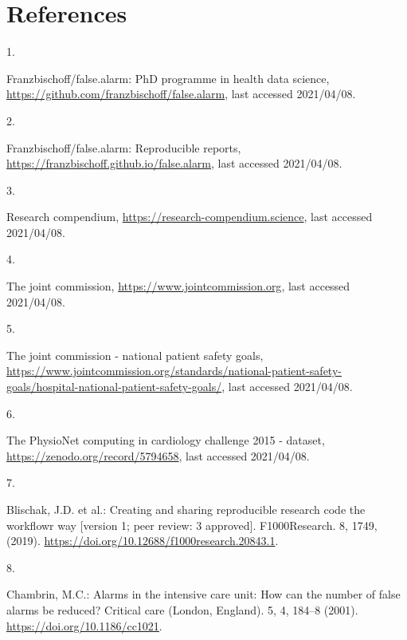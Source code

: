 \documentclass[runningheads]{llncs}
\newlength{\cslhangindent}
\newlength{\csllabelwidth}
\newenvironment{CSLReferences}[2] %
 {%
  \setlength{\parindent}{0pt}
  \ifodd #1 \everypar{\setlength{\hangindent}{\cslhangindent}}\ignorespaces\fi
  \ifnum #2 > 0
  \setlength{\parskip}{#2\baselineskip}
  \fi
 }%
 {}
\newcommand{\CSLLeftMargin}[1]{\parbox[t]{\csllabelwidth}{#1}}
\newcommand{\CSLRightInline}[1]{\parbox[t]{\linewidth - \csllabelwidth}{#1}\break}
\begin{document}
\hypertarget{references}{%
\section*{References}\label{references}}

\hypertarget{refs}{}
\begin{CSLReferences}{0}{0}
\leavevmode{}%
\CSLLeftMargin{1. }
\CSLRightInline{Franzbischoff/false.alarm: PhD programme in health data
science, \url{https://github.com/franzbischoff/false.alarm}, last
accessed 2021/04/08.}

\leavevmode{}%
\CSLLeftMargin{2. }
\CSLRightInline{Franzbischoff/false.alarm: Reproducible reports,
\url{https://franzbischoff.github.io/false.alarm}, last accessed
2021/04/08.}

\leavevmode{}%
\CSLLeftMargin{3. }
\CSLRightInline{Research compendium,
\url{https://research-compendium.science}, last accessed 2021/04/08.}

\leavevmode{}%
\CSLLeftMargin{4. }
\CSLRightInline{The joint commission,
\url{https://www.jointcommission.org}, last accessed 2021/04/08.}

\leavevmode{}%
\CSLLeftMargin{5. }
\CSLRightInline{The joint commission - national patient safety goals,
\url{https://www.jointcommission.org/standards/national-patient-safety-goals/hospital-national-patient-safety-goals/},
last accessed 2021/04/08.}

\leavevmode{}%
\CSLLeftMargin{6. }
\CSLRightInline{The PhysioNet computing in cardiology challenge 2015 -
dataset, \url{https://zenodo.org/record/5794658}, last accessed
2021/04/08.}

\leavevmode{}%
\CSLLeftMargin{7. }
\CSLRightInline{Blischak, J.D. et al.: Creating and sharing reproducible
research code the workflowr way {[}version 1; peer review: 3
approved{]}. F1000Research. 8, 1749, (2019).
\url{https://doi.org/10.12688/f1000research.20843.1}.}

\leavevmode{}%
\CSLLeftMargin{8. }
\CSLRightInline{Chambrin, M.C.: Alarms in the intensive care unit: How
can the number of false alarms be reduced? Critical care (London,
England). 5, 4, 184--8 (2001). \url{https://doi.org/10.1186/cc1021}.}


\end{CSLReferences}
\end{document}

